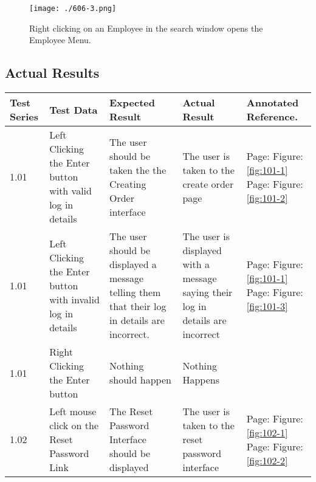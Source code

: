 \begin{figure}[H]
    \texttt{[image: ./606-3.png]}
    \caption{Right clicking on an Employee in the search window opens the Employee Menu.} \label{fig:606-3}
\end{figure}



\pagebreak

\subsection{Actual Results}

\begin{flushleft}
    \begin{longtable}{|p{1.0cm}|p{2.5cm}|p{3cm}|p{3.0cm}|p{2.5cm}|}
        \hline
        \textbf{Test Series} & \textbf{Test Data} & \textbf{Expected Result} &  \textbf{Actual Result} &  \textbf{Annotated Reference.}\\ \hline
	1.01 & Left Clicking the Enter button with valid log in details & The user should be taken the the Creating Order interface& The user is taken to the create order page  & Page:\pageref{fig:101-1}  \newline Figure:\ref{fig:101-1}  \newline  \newline Page:\pageref{fig:101-2}  \newline Figure:\ref{fig:101-2} \\ \hline
	1.01 & Left Clicking the Enter button with invalid log in details &The user should be displayed a message telling them that their log in details are incorrect. & The user is displayed with a message saying their log in details are incorrect & Page:\pageref{fig:101-1}  \newline Figure:\ref{fig:101-1} \newline  \newline Page:\pageref{fig:101-3}  \newline Figure:\ref{fig:101-3}\\ \hline
	1.01 & Right Clicking the Enter button & Nothing should happen & Nothing Happens &\\ \hline 
	1.02 & Left mouse click on the Reset Password Link & The Reset Password Interface should be displayed & The user is taken to the reset password interface & Page:\pageref{fig:102-1}  \newline Figure:\ref{fig:102-1} \newline  \newline  Page:\pageref{fig:102-2}  \newline Figure:\ref{fig:102-2}\\ \hline

\end{longtable}
\end{flushleft}
